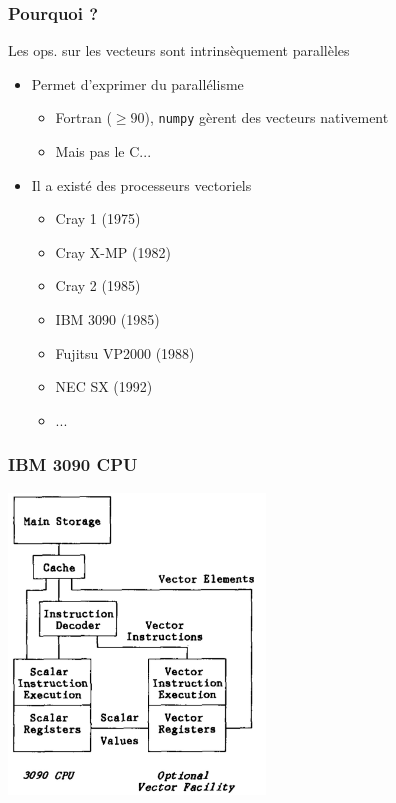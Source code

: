 \documentclass[xcolor={x11names,svgnames}]{beamer}
\begin{document}
\begin{frame}
  \frametitle{Pourquoi ?}

  \begin{block}{Les ops. sur les vecteurs sont \alert{intrinsèquement parallèles}}
    \begin{itemize}
    \item Permet d'exprimer du parallélisme
      \begin{itemize}
      \item Fortran ($\geq 90$), \texttt{numpy} gèrent des vecteurs nativement
      \item Mais pas le C...
      \end{itemize}

      \medskip
      
    \item Il a existé des \alert{processeurs vectoriels}
      \begin{itemize}
      \item Cray 1 (1975)
      \item Cray X-MP (1982)
      \item Cray 2 (1985)
      \item IBM 3090 (1985)
      \item Fujitsu VP2000 (1988)
      \item NEC SX (1992)
      \item ...
      \end{itemize}
    \end{itemize}
  \end{block}
\end{frame}


\begin{frame}
  \frametitle{IBM 3090 CPU}

  \centering
  \includegraphics[height=8cm]{ibm_3090.jpg}  
\end{frame}
\end{document}
